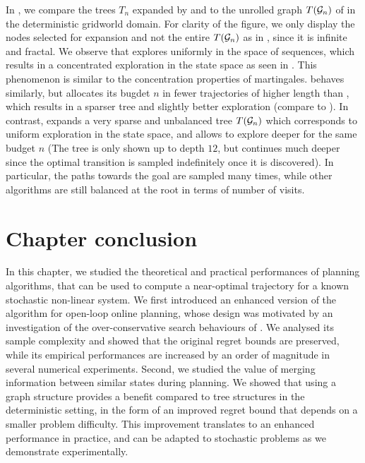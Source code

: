 In , we compare the trees $T_n$ expanded by \OPD and \KLOLOP to the unrolled graph $T(\mathcal{G}_n)$ of \GBOPD in the deterministic gridworld domain. For clarity of the figure, we only display the nodes selected for expansion and not the entire $T(\mathcal{G}_n)$ as in , since it is infinite and fractal. We observe that \OPD explores uniformly in the space of sequences, which results in a concentrated exploration in the state space as seen in . This phenomenon is similar to the concentration properties of martingales. \KLOLOP behaves similarly, but allocates its bugdet $n$ in fewer trajectories of higher length than \OPD, which results in a sparser tree and slightly better exploration (compare  to ). In contrast, \GBOPD expands a very sparse and unbalanced tree $T(\mathcal{G}_n)$ which corresponds to uniform exploration in the state space, and allows to explore deeper for the same budget $n$ (The tree is only shown up to depth $12$, but continues much deeper since the optimal transition is sampled indefinitely once it is discovered). In particular, the paths towards the goal are sampled many times, while other algorithms are still balanced at the root in terms of number of visits.

\section*{Chapter conclusion}

In this chapter, we studied the theoretical and practical performances of planning algorithms, that can be used to compute a near-optimal trajectory for a known stochastic non-linear system.
We first introduced an enhanced version of the \OLOP algorithm for open-loop online planning, whose design was motivated by an investigation of the over-conservative search behaviours of \OLOP. We analysed its sample complexity and showed that the original regret bounds are preserved, while its empirical performances are increased by an order of magnitude in several numerical experiments. Second, we studied the value of merging information between similar states during planning. We showed that using a graph structure provides a benefit compared to tree structures in the deterministic setting, in the form of an improved regret bound that depends on a smaller problem difficulty. This improvement translates to an enhanced performance in practice, and can be adapted to stochastic problems as we demonstrate experimentally.

%

